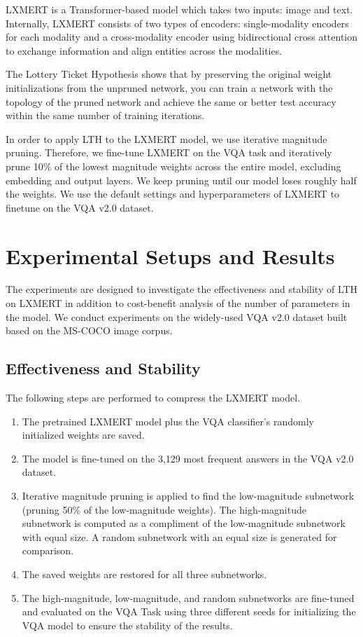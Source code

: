 \documentclass[11pt,a4paper]{article}
\begin{document}
LXMERT is a Transformer-based model which takes two inputs: image and text. Internally, LXMERT consists of two types of encoders: single-modality encoders for each modality and a cross-modality encoder using bidirectional cross attention to exchange information and align entities across the modalities.

The Lottery Ticket Hypothesis \cite{frankle2018the} shows that by preserving the original weight initializations from the unpruned network, you can train a network with the topology of the pruned network and achieve the same or better test accuracy within the same number of training iterations.

In order to apply LTH to the LXMERT model, we use iterative magnitude pruning. Therefore, we fine-tune LXMERT on the VQA task and iteratively prune 10\% of the lowest magnitude weights across the entire model, excluding embedding and output layers. We keep pruning until our model loses roughly half the weights. We use the default settings and hyperparameters of LXMERT \cite{Tan2020} to finetune on the VQA v2.0 dataset.

\section{Experimental Setups and Results}

The experiments are designed to investigate the effectiveness and stability of LTH on LXMERT in addition to cost-benefit analysis of the number of parameters in the model. We conduct experiments on the widely-used VQA v2.0 \cite{goyal2017making} dataset built based on the MS-COCO \cite{lin2014microsoft} image corpus.

\subsection{Effectiveness and Stability}
The following steps are performed to compress the LXMERT model.
\begin{enumerate}
    \itemsep0em
    \item The pretrained LXMERT model plus the VQA classifier's randomly initialized weights are saved.
    \item The model is fine-tuned on the 3,129 most frequent answers in the VQA v2.0 dataset.
    \item Iterative magnitude pruning is applied to find the low-magnitude subnetwork (pruning 50\% of the low-magnitude weights). The high-magnitude subnetwork is computed as a compliment of the low-magnitude subnetwork with equal size. A random subnetwork with an equal size is generated for comparison.
    \item The saved weights are restored for all three subnetworks.
    \item The high-magnitude, low-magnitude, and random subnetworks are fine-tuned and evaluated on the VQA Task using three different seeds for initializing the VQA model to ensure the stability of the results.
\end{enumerate}
\end{document}

